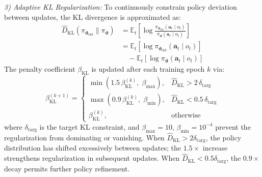 \documentclass[lettersize,journal]{IEEEtran}
\begin{document}
\emph{3) Adaptive KL Regularization:} To continuously constrain policy deviation between updates, the KL divergence is approximated as:
\begin{equation}
\label{eq:kl_approx}
\begin{split}
\hat{D}_{\mathrm{KL}}\!\left(\pi_{\boldsymbol{\vartheta}_{\mathrm{old}}} \| \pi_{\boldsymbol{\vartheta}}\right) &= \mathbb{E}_t\!\left[\log\frac{\pi_{\boldsymbol{\vartheta}_{\mathrm{old}}}(\mathbf{a}_t \mid o_t)}{\pi_{\boldsymbol{\vartheta}}(\mathbf{a}_t \mid o_t)}\right] \\
&= \mathbb{E}_t\!\left[\log\pi_{\boldsymbol{\vartheta}_{\mathrm{old}}}(\mathbf{a}_t \mid o_t)\right] \\
&\quad - \mathbb{E}_t\!\left[\log\pi_{\boldsymbol{\vartheta}}(\mathbf{a}_t \mid o_t)\right]
\end{split}
\end{equation}
The penalty coefficient $\beta_{\mathrm{KL}}$ is updated after each training epoch $k$ via:
\begin{equation}
\label{eq:kl_adapt}
\beta_{\mathrm{KL}}^{(k+1)} =
\begin{cases}
\min\!\left(1.5\,\beta_{\mathrm{KL}}^{(k)},\; \beta_{\max}\right), & \hat{D}_{\mathrm{KL}} > 2\,\delta_{\mathrm{targ}} \\[6pt]
\max\!\left(0.9\,\beta_{\mathrm{KL}}^{(k)},\; \beta_{\min}\right), & \hat{D}_{\mathrm{KL}} < 0.5\,\delta_{\mathrm{targ}} \\[6pt]
\beta_{\mathrm{KL}}^{(k)}, & \text{otherwise}
\end{cases}
\end{equation}
where $\delta_{\mathrm{targ}}$ is the target KL constraint, and
$\beta_{\max}=10$, $\beta_{\min}=10^{-4}$ prevent the regularization from
dominating or vanishing. When
$\hat{D}_{\mathrm{KL}}>2\delta_{\mathrm{targ}}$, the
policy distribution has shifted
excessively between updates; the $1.5\times$ increase
strengthens regularization in
subsequent updates. When
$\hat{D}_{\mathrm{KL}}<0.5\delta_{\mathrm{targ}}$, the $0.9\times$ decay
permits further policy refinement.
\end{document}
